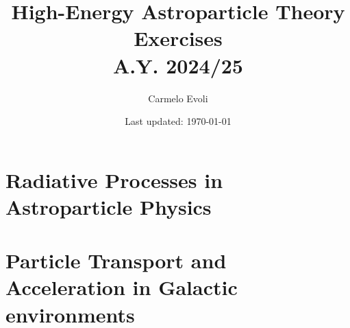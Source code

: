 \documentclass[letterpaper, 11pt, notitlepage]{report}
\begin{document}
\title{High-Energy Astroparticle Theory \\ {\color{blue}Exercises} \\[1em]
\normalsize A.Y. 2024/25}

\author{\normalsize Carmelo Evoli}
\date{\normalsize\vspace{-1ex} Last updated: \today}

\maketitle

\tableofcontents\label{sec:contents}

\newpage

\chapter{Radiative Processes in Astroparticle Physics} 








\chapter{Particle Transport and Acceleration in Galactic environments}








%
%



\end{document}
